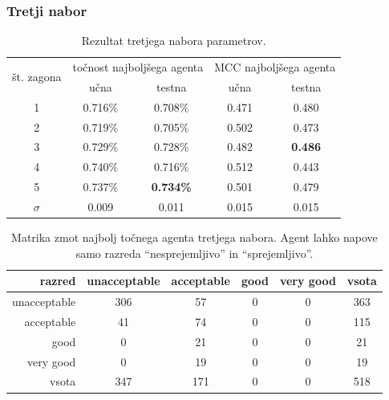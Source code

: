 \subsubsection{Tretji nabor}
\begin{table}[H]
    \caption{Rezultat tretjega nabora parametrov.}
    \begin{center}
        \begin{tabular}{|| c | c c || c c ||}
            \hline
            \multirow{2}{*}{št. zagona} & \multicolumn{2}{c||}{točnost najboljšega agenta} & \multicolumn{2}{c||}{MCC najboljšega agenta} \\ \cline{2-5}
            & učna    & testna           & učna  & testna         \\
            \hline
            1        & 0.716\% & 0.708\%          & 0.471 & 0.480          \\
            \hline
            2        & 0.719\% & 0.705\%          & 0.502 & 0.473          \\
            \hline
            3        & 0.729\% & 0.728\%          & 0.482 & \textbf{0.486} \\
            \hline
            4        & 0.740\% & 0.716\%          & 0.512 & 0.443          \\
            \hline
            5        & 0.737\% & \textbf{0.734\%} & 0.501 & 0.479          \\
            \hline
            $\sigma$ & 0.009   & 0.011            & 0.015 & 0.015          \\
            \hline
        \end{tabular}
    \end{center}
    \label{tab:car_result_3}
\end{table}

\begin{table}[H]
    \centering
    \caption{Matrika zmot najbolj točnega agenta tretjega nabora. Agent lahko napove samo razreda \enquote{nesprejemljivo} in \enquote{sprejemljivo}.}
    \begin{tabular}{||rccccc||}
        \hline
        razred       & unacceptable & acceptable & good & very good & vsota \\ \hline
        unacceptable & 306          & 57         & 0    & 0         & 363   \\ \hline
        acceptable   & 41           & 74         & 0    & 0         & 115   \\ \hline
        good         & 0            & 21         & 0    & 0         & 21    \\ \hline
        very good    & 0            & 19         & 0    & 0         & 19    \\ \hline
        vsota        & 347          & 171        & 0    & 0         & 518   \\ \hline
    \end{tabular}
    \label{tab:car_acc_3}
\end{table}

